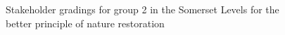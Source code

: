 \documentclass[
  12pt,
  letterpaper,
  DIV=11,
  numbers=noendperiod]{scrartcl}
\begin{document}
\begin{figure}[H]


\caption{\label{fig-SomBetterG2}Stakeholder gradings for group 2 in the
Somerset Levels for the better principle of nature restoration}

\end{figure}%
\end{document}
